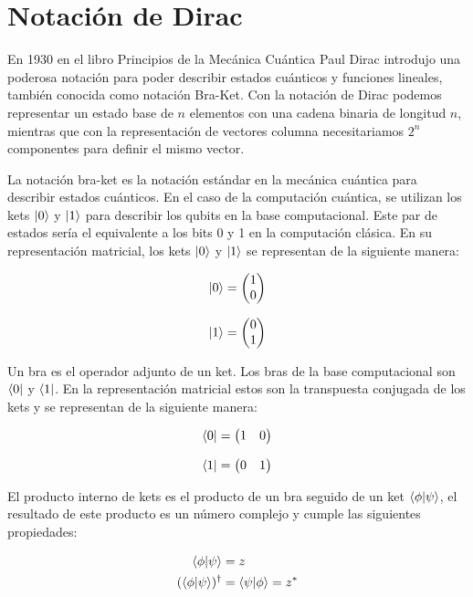 \section{Notación de Dirac}

En 1930 en el libro Principios de la Mecánica Cuántica Paul Dirac introdujo una poderosa notación para poder describir estados cuánticos y funciones lineales, también conocida como notación Bra-Ket. Con la notación de Dirac podemos representar un estado base de $n$ elementos con una cadena binaria de longitud $n$, mientras que con la representación de vectores columna necesitariamos $2^n$ componentes para definir el mismo vector.

La notación bra-ket es la notación estándar en la mecánica cuántica para describir estados cuánticos. En el caso de la computación cuántica, se utilizan los kets $\ket{0}$ y $\ket{1}$ para describir los qubits en la base computacional. Este par de estados sería el equivalente a los bits 0 y 1 en la computación clásica. En su representación matricial, los kets $\ket{0}$ y $\ket{1}$ se representan de la siguiente manera:

\[\ket{0} = \begin{pmatrix} 1 \\ 0 \end{pmatrix}\]

\[\ket{1} = \begin{pmatrix} 0 \\ 1 \end{pmatrix}\]

Un bra es el operador adjunto de un ket. Los bras de la base computacional son $\bra{0}$ y $\bra{1}$. En la representación matricial estos son la transpuesta conjugada de los kets y se representan de la siguiente manera:

\[\bra{0} = \begin{pmatrix} 1 & 0 \end{pmatrix}\]

\[\bra{1} = \begin{pmatrix} 0 & 1 \end{pmatrix}\]

El producto interno de kets es el producto de un bra seguido de un ket $\braket{\phi}{\psi}$, el resultado de este producto es un número complejo y cumple las siguientes propiedades:

\begin{align}
    \braket{\phi}{\psi} &= z \\
    (\braket{\phi}{\psi})^\dagger &= \braket{\psi}{\phi} = z^*
\end{align}

